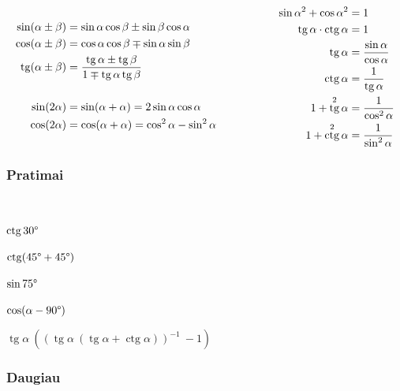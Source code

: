 \documentclass[fleqn]{article} %
\newenvironment{exercises}{\begin{enumerate*}[label=\alph*), itemjoin=\qquad]}{\end{enumerate*}}
\DeclareMathOperator{\tg}{tg}
\DeclareMathOperator{\ctg}{ctg}
\begin{document}
\begin{equation*} \\
    \begin{aligned}[c]
        \sin(\alpha \pm \beta) &= \sin\alpha\cos\beta \pm \sin\beta\cos\alpha \\
        \cos(\alpha \pm \beta) &= \cos\alpha\cos\beta \mp \sin\alpha\sin\beta \\
        \tg (\alpha \pm \beta) &= \frac{\tg\alpha \pm \tg\beta}{1 \mp \tg\alpha \tg\beta} \\ \\
        \sin(2\alpha) &= \sin(\alpha + \alpha) = 2\sin\alpha\cos\alpha \\
        \cos(2\alpha) &= \cos(\alpha + \alpha) = \cos^2\alpha - \sin^2\alpha
    \end{aligned}
    \hspace{20mm}
    \begin{aligned}[c]
        \sin{\alpha}^2 + \cos{\alpha}^2 &= 1 \\
        \tg \alpha \cdot \ctg \alpha &= 1 \\
        \tg \alpha &= \frac{\sin \alpha}{\cos \alpha} \\
        \ctg \alpha &= \frac{1}{\tg \alpha} \\
        1 + \tg^2 \alpha &= \frac{1}{\cos^2 \alpha} \\  
        1 + \ctg^2 \alpha &= \frac{1}{\sin^2 \alpha} \\  
    \end{aligned}
\end{equation*}

\subsubsection{Pratimai}

\begin{exercises} \\
    \item $\ctg 30\degree               $
    \item $\ctg(45\degree + 45\degree)  $
    \item $\sin 75\degree               $
    \item $\cos( \alpha - 90\degree )   $
    \item $\tg \alpha\ ((\tg\alpha\ (\tg \alpha + \ctg \alpha))^{-1}\ - 1) $ 
\end{exercises} 

\subsubsection{Daugiau}
\end{document}
